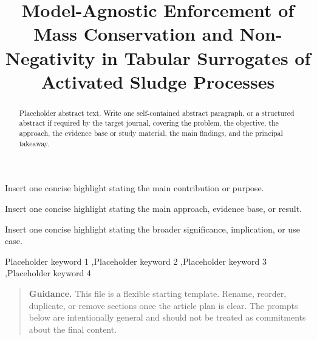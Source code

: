 \documentclass[a4paper,fleqn]{cas-sc}
\newcommand{\draftguidance}[1]{%
\begin{quote}
\small
\textbf{Guidance.} #1
\end{quote}
}
\begin{document}
\let\WriteBookmarks\relax
\def\floatpagepagefraction{1}
\def\textpagefraction{.001}

\shortauthors{}

\title[mode=title]{Model-Agnostic Enforcement of Mass Conservation and Non-Negativity in Tabular Surrogates of Activated Sludge Processes}

\author{}

\begin{abstract}
Placeholder abstract text. Write one self-contained abstract paragraph, or a structured abstract if required by the target journal, covering the problem, the objective, the approach, the evidence base or study material, the main findings, and the principal takeaway.
\end{abstract}

\begin{graphicalabstract}
\centering
{}
\end{graphicalabstract}

\begin{highlights}
\item Insert one concise highlight stating the main contribution or purpose.
\item Insert one concise highlight stating the main approach, evidence base, or result.
\item Insert one concise highlight stating the broader significance, implication, or use case.
\end{highlights}

\begin{keywords}
Placeholder keyword 1 \sep Placeholder keyword 2 \sep Placeholder keyword 3 \sep Placeholder keyword 4
\end{keywords}

\maketitle

\draftguidance{This file is a flexible starting template. Rename, reorder, duplicate, or remove sections once the article plan is clear. The prompts below are intentionally general and should not be treated as commitments about the final content.}
\end{document}
